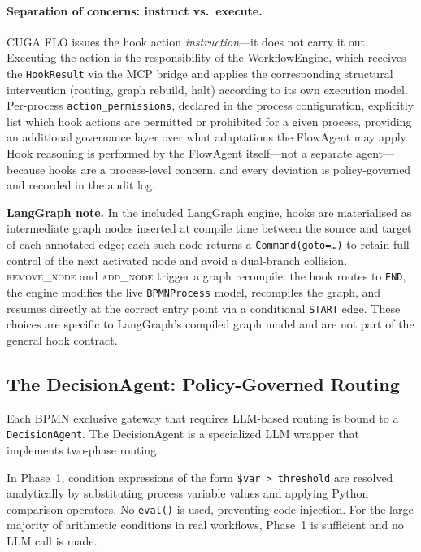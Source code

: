 \documentclass[11pt,a4paper]{article}
\begin{document}
\paragraph{Separation of concerns: instruct vs.\ execute.}
CUGA FLO issues the hook action \emph{instruction}---it does not carry it out.
Executing the action is the responsibility of the WorkflowEngine, which receives
the \texttt{HookResult} via the MCP bridge and applies the corresponding structural
intervention (routing, graph rebuild, halt) according to its own execution model.
Per-process \texttt{action\_permissions}, declared in the process configuration,
explicitly list which hook actions are permitted or prohibited for a given process,
providing an additional governance layer over what adaptations the FlowAgent may
apply. Hook reasoning is performed by the FlowAgent itself---not a separate
agent---because hooks are a process-level concern, and every deviation is
policy-governed and recorded in the audit log.

\begin{tealframe}
\textbf{LangGraph note.} In the included LangGraph engine, hooks are materialised as
intermediate graph nodes inserted at compile time between the source and target of
each annotated edge; each such node returns a \texttt{Command(goto=\ldots)} to retain
full control of the next activated node and avoid a dual-branch collision.
\textsc{remove\_node} and \textsc{add\_node} trigger a graph recompile: the hook
routes to \texttt{END}, the engine modifies the live \texttt{BPMNProcess} model,
recompiles the graph, and resumes directly at the correct entry point via a
conditional \texttt{START} edge. These choices are specific to LangGraph's compiled
graph model and are not part of the general hook contract.
\end{tealframe}

\subsection{The DecisionAgent: Policy-Governed Routing}

Each BPMN exclusive gateway that requires LLM-based routing is bound to a
\texttt{DecisionAgent}. The DecisionAgent is a specialized LLM wrapper that
implements two-phase routing.

In Phase~1, condition expressions of the form \texttt{\${var} \textgreater\
threshold} are resolved analytically by substituting process variable values and
applying Python comparison operators. No \texttt{eval()} is used, preventing code
injection. For the large majority of arithmetic conditions in real workflows,
Phase~1 is sufficient and no LLM call is made.
\end{document}
